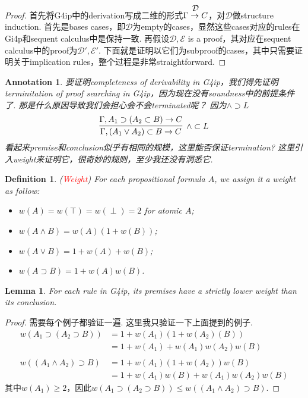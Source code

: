 \documentclass{article}
\theoremstyle{plain}
\newtheorem{lemma}[theorem]{Lemma}
\newtheorem{definition}[theorem]{Definition}
\newtheorem{annotation}[theorem]{Annotation}
\theoremstyle{nonumberplain}
\newtheorem{proof}{Proof}
\newcommand{\redt}[1]{\textcolor{red}{#1}}
\begin{document}
\begin{proof}
\rm  首先将G4ip中的derivation写成二维的形式$\deduce{\Gamma \to C}{\mathcal{D}}$，对$\mathcal{D}$做structure induction. 首先是bases cases，即$\mathcal{D}$为empty的cases，显然这些cases对应的rules在Gi4p和sequent calculus中是保持一致. 再假设$\mathcal{D},\mathcal{E}$ is a proof，其对应在sequent calculus中的proof为$\mathcal{D}',\mathcal{E}'$. 下面就是证明以它们为subproof的cases，其中只需要证明关于implication rules，整个过程是非常straightforward. 
\end{proof}

\begin{annotation}
\rm 要证明completeness of derivability in G4ip，我们得先证明terminitation of proof searching in G4ip，因为现在没有soundness中的前提条件了. 那是什么原因导致我们会担心会不会terminated呢？ 因为$\wedge \supset L$
$$
\infer[\wedge \subset L]{\Gamma, (A_1 \vee A_2) \subset B \to C}{\Gamma, A_1 \supset (A_2 \subset B) \to C}
$$
看起来premise和conclusion似乎有相同的规模，这里能否保证termination? 这里引入weight来证明它，很奇妙的规则，至少我还没有洞悉它. 
\end{annotation}

\begin{definition}
\rm (\redt{Weight}) For each propositional formula $A$, we assign it a weight as follow:
\begin{itemize}
	\item $w(A)=w(\top)=w(\perp) = 2$ for atomic $A$;
	\item $w(A \wedge B) = w(A)(1+w(B))$;
	\item $w(A \vee B) = 1 + w(A) + w(B)$;
	\item $w(A \supset B) = 1 + w(A)w(B)$.
\end{itemize}
\end{definition}

\begin{lemma}\label{amazing-weight}
\rm For each rule in G4ip, its premises have a strictly lower weight than its conclusion. 
\end{lemma}

\begin{proof}
需要每个例子都验证一遍. 这里我只验证一下上面提到的例子. 
$$
\begin{aligned}
w(A_1\supset (A_2 \supset B)) &= 1 + w(A_1)(1+w(A_2)(B)) \\
&= 1 + w(A_1) + w(A_1)w(A_2)w(B)\\\\
w((A_1 \wedge A_2) \supset B) &= 1 + w(A_1)(1+w(A_2))w(B) \\
&=1 + w(A_1)w(B) + w(A_1)w(A_2)w(B)
\end{aligned}
$$
其中$w(A_1) \geq 2$，因此$w(A_1\supset (A_2 \supset B)) \leq w((A_1 \wedge A_2) \supset B)$.
\end{proof}
\end{document}
